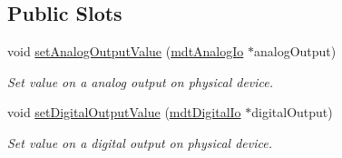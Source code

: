 \subsection*{Public Slots}
\begin{DoxyCompactItemize}
\item 
void \hyperlink{classmdt_multi_io_device_ae32a7d5dc984e502420983bcbc0e919d}{set\-Analog\-Output\-Value} (\hyperlink{classmdt_analog_io}{mdt\-Analog\-Io} $\ast$analog\-Output)
\begin{DoxyCompactList}\small\item\em Set value on a analog output on physical device. \end{DoxyCompactList}\item 
void \hyperlink{classmdt_multi_io_device_a6b4537b09f396b4016772b128fdff277}{set\-Digital\-Output\-Value} (\hyperlink{classmdt_digital_io}{mdt\-Digital\-Io} $\ast$digital\-Output)
\begin{DoxyCompactList}\small\item\em Set value on a digital output on physical device. \end{DoxyCompactList}\end{DoxyCompactItemize}
